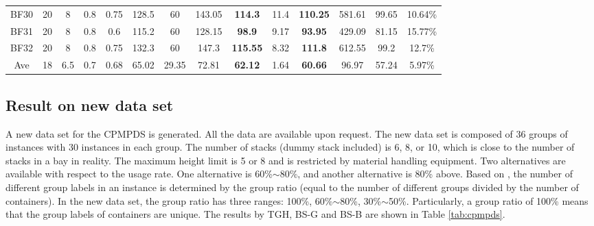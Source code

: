 \documentclass[review,3p,times,authoryear,12pt]{elsarticle}
\begin{document}
\begin{table}[!htb]
\begin{tabular}{c|c|c|c|c|c|c|c|c|c|c|c|c|c}
    BF30  & 20 & 8  & 0.8 & 0.75 & 128.5 & 60    & 143.05 &\textbf{ 114.3}& 11.4    & \textbf{110.25}& 581.61  & 99.65 & 10.64\%\\
    BF31  & 20 & 8  & 0.8 & 0.6  & 115.2 & 60    & 128.15 & \textbf{98.9} & 9.17    & \textbf{93.95} & 429.09  & 81.15 & 15.77\%\\
    BF32  & 20 & 8  & 0.8 & 0.75 & 132.3 & 60    & 147.3  & \textbf{115.55}& 8.32   & \textbf{111.8} & 612.55  & 99.2  & 12.7\%\\
    \hline
    Ave   & 18 & 6.5& 0.7 & 0.68 & 65.02 & 29.35 & 72.81  & \textbf{62.12}& 1.64    & \textbf{60.66} & 96.97   & 57.24 & 5.97\%\\
   \hline
\end{tabular}
\end{table}

\subsection {Result on new data set}

A new data set for the CPMPDS is generated. All the data are available upon request. %
The new data set is composed of 36 groups of instances with 30 instances in each group.
The number of stacks (dummy stack included) is 6, 8, or 10, which is close to the number of stacks in a bay in reality.
The maximum height limit is 5 or 8 and is restricted by material handling equipment.
Two alternatives are available with respect to the usage rate. One alternative is 60\%$\sim$80\%, and another alternative is 80\% above.
Based on \cite{BF2012}, the number of different group labels in an instance is determined by the group ratio (equal to the number of different groups divided by the number of containers).
In the new data set, the group ratio has three ranges: 100\%, 60\%$\sim$80\%, 30\%$\sim$50\%.
Particularly, a group ratio of 100\% means that the group labels of containers are unique.
The results by TGH, BS-G and BS-B are shown in Table \ref{tab:cpmpds}.
\end{document}
